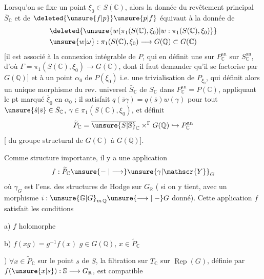 Lorsqu'on se fixe un point $\xi_0\in S(\mathbb{C})$,\deleted{\unsure{$\xi$|,}} alors la donnée du revêtement principal $\bar S_{\mathbb{C}}$ et de $\deleted{\unsure{f|p}}\unsure{p|f}$ équivaut à la donnée de
\[
\begin{aligned}
&\deleted{\unsure{w(\pi_1(S(\mathbb{C}),\xi_0)|w:\pi_1(S(\mathbb{C}),\xi_0)}}\\
&\unsure{w|\omega}:\pi_1(S(\mathbb{C}),\xi_0)\longrightarrow G(\mathbb{Q})\subset G(\mathbb{C})
\end{aligned}
\]
[il est associé à la connexion intégrable de $P$, qui en définit une sur $P_{\mathbb{C}}^{\mathrm{an}}$ sur $S_{\mathbb{C}}^{\mathrm{an}}$, d'où $\Gamma=\pi_1(S(\mathbb{C}),\xi_0)\longrightarrow G(\mathbb{C})$, dont il faut demander qu'il se factorise par $G(\mathbb{Q})$] et à un  point $\alpha_0$ de $P(\xi_0)$ i.e. une trivialisation de $P_{\xi_0}$, qui définit alors un unique morphisme  du rev. universel $\bar S_{\mathbb{C}}$ de $S_{\mathbb{C}}$ dans $P_{\mathbb{C}}^{\mathrm{an}}=P(\mathbb{C})$, appliquant le pt marqué $\bar\xi_0$ en $\alpha_0$ ; il satisfait  $q(\bar s\gamma)=q(\bar s)w(\gamma)$ pour tout $\unsure{\hat s|\bar s}\in\bar S_{\mathbb{C}}$,  $\gamma\in\pi_1(S(\mathbb{C}),\xi_0)$,  et définit
\[
\widetilde P_{\mathbb{C}}=\overline{\unsure{S|\mathbb{S}}}_{\mathbb{C}}\mathbin{\times}^{\Gamma}G(\mathbb{Q})\hookrightarrow P_{\mathbb{C}}^{\mathrm{an}}
\]
[ du groupe structural  de $G(\mathbb{C})$ à $G(\mathbb{Q})$].

Comme structure importante, il y a une application
\[
f:\widetilde P_{\mathbb{C}}\unsure{\relbar|\longrightarrow}\unsure{\gamma|\mathscr{Y}}_G
\]
où $\gamma_G$ est l'ens. des structures de Hodge sur $G_{\mathbb{R}}$ ( si on y tient, avec un morphisme $i:\unsure{\mathbb{G}|G}_{m\,\mathbb{Q}}\unsure{\longrightarrow|\relbar}G$ donné). Cette application $f$ satisfait les conditions

a) $f$ holomorphe

b) $f(xg)=g^{-1}f(x)$ \qquad $g\in G(\mathbb{Q}),\,x\in\widetilde P_{\mathbb{C}}$

) $\forall x\in\widetilde P_{\mathbb{C}}$ sur le point $s$ de $S$, la  filtration sur $T_{\mathbb{C}}$ sur $\operatorname{Rep}(G)$, définie par $f(\unsure{x|s}):\mathbb{S}\longrightarrow G_{\mathbb{R}}$, est compatible
